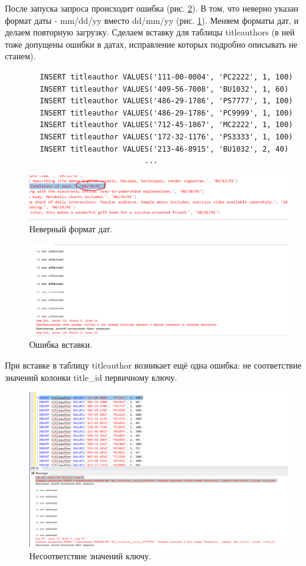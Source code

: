 После запуска запроса происходит ошибка (рис. \ref{fig:ERR}). В том, что неверно указан формат даты - mm/dd/yy вместо dd/mm/yy (рис. \ref{fig:TQ1Solve}). Меняем форматы дат, и делаем повторную загрузку. Сделаем вставку для таблицы titleauthors (в ней тоже допущены ошибки в датах, исправление которых подробно описывать не станем).
\begin{verbatim}
        INSERT titleauthor VALUES('111-00-0004', 'PC2222', 1, 100)
        INSERT titleauthor VALUES('409-56-7008', 'BU1032', 1, 60)
        INSERT titleauthor VALUES('486-29-1786', 'PS7777', 1, 100)
        INSERT titleauthor VALUES('486-29-1786', 'PC9999', 1, 100)
        INSERT titleauthor VALUES('712-45-1867', 'MC2222', 1, 100)
        INSERT titleauthor VALUES('172-32-1176', 'PS3333', 1, 100)
        INSERT titleauthor VALUES('213-46-8915', 'BU1032', 2, 40)
                                ...
\end{verbatim}
\begin{figure}[h!]
    \centering
    \includegraphics[width=0.8\linewidth]{Pic/lab3/TQ1Solve.PNG}
    \caption{Неверный формат дат.}
    \label{fig:TQ1Solve}
\end{figure}
\begin{figure}[h!]
    \centering
    \includegraphics[width=0.85\linewidth]{Pic/lab3/TQ1ERROR.PNG}
    \caption{Ошибка вставки.}
    \label{fig:ERR}
\end{figure}

При вставке в таблицу titleauthor возникает ещё одна ошибка: не соответствие значений колонки title\_id первичному ключу. 
\begin{figure}[h!]
    \centering
    \includegraphics[width=0.7\linewidth]{Pic/lab3/TAQ1Error.PNG}
    \caption{Несоответствие значений ключу.}
    \label{fig:enter-label}
\end{figure}

